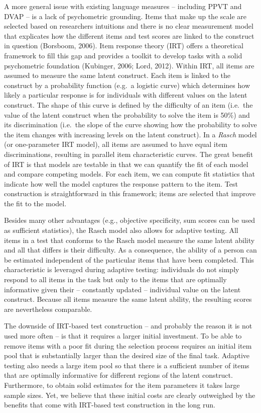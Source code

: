 \documentclass[
  man,floatsintext]{apa6}
\begin{document}
A more general issue with existing language measures -- including PPVT and DVAP -- is a lack of psychometric grounding. Items that make up the scale are selected based on researchers intuitions and there is no clear measurement model that explicates how the different items and test scores are linked to the construct in question (Borsboom, 2006). Item response theory (IRT) offers a theoretical framework to fill this gap and provides a toolkit to develop tasks with a solid psychometric foundation (Kubinger, 2006; Lord, 2012). Within IRT, all items are assumed to measure the same latent construct. Each item is linked to the construct by a probability function (e.g.~a logistic curve) which determines how likely a particular response is for individuals with different values on the latent construct. The shape of this curve is defined by the difficulty of an item (i.e.~the value of the latent construct when the probability to solve the item is 50\%) and its discrimination (i.e.~the slope of the curve showing how the probability to solve the item changes with increasing levels on the latent construct). In a \emph{Rasch} model (or one-parameter IRT model), all items are assumed to have equal item discriminations, resulting in parallel item characteristic curves. The great benefit of IRT is that models are testable in that we can quantify the fit of each model and compare competing models. For each item, we can compute fit statistics that indicate how well the model captures the response pattern to the item. Test construction is straightforward in this framework; items are selected that improve the fit to the model.

Besides many other advantages (e.g., objective specificity, sum scores can be used as sufficient statistics), the Rasch model also allows for adaptive testing. All items in a test that conforms to the Rasch model measure the same latent ability and all that differs is their difficulty. As a consequence, the ability of a person can be estimated independent of the particular items that have been completed. This characteristic is leveraged during adaptive testing: individuals do not simply respond to all items in the task but only to the items that are optimally informative given their -- constantly updated -- individual value on the latent construct. Because all items measure the same latent ability, the resulting scores are nevertheless comparable.

The downside of IRT-based test construction -- and probably the reason it is not used more often -- is that it requires a larger initial investment. To be able to remove items with a poor fit during the selection process requires an initial item pool that is substantially larger than the desired size of the final task. Adaptive testing also needs a large item pool so that there is a sufficient number of items that are optimally informative for different regions of the latent construct. Furthermore, to obtain solid estimates for the item parameters it takes large sample sizes. Yet, we believe that these initial costs are clearly outweighed by the benefits that come with IRT-based test construction in the long run.
\end{document}
